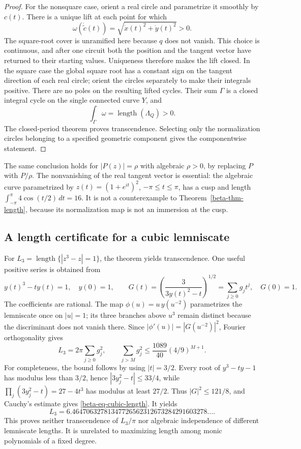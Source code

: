 \documentclass[11pt,a4paper]{article}
\theoremstyle{definition}
\theoremstyle{remark}
\numberwithin{equation}{section}
\begin{document}
\begin{proof}
For the nonsquare case, orient a real circle and parametrize it smoothly
by $c(t)$.  There is a unique lift at each point for which
\[
\omega(\dot{\widetilde c}(t))
=\sqrt{\dot x(t)^2+\dot y(t)^2}>0.
\]
The square-root cover is unramified here because $q$ does not vanish.
This choice is continuous, and after one circuit both the position and
the tangent vector have returned to their starting values.  Uniqueness
therefore makes the lift closed.  In the square case the global square
root has a constant sign on the tangent direction of each real circle;
orient the circles separately to make their integrals positive.
There are no poles on the resulting lifted cycles.  Their sum $\Gamma$
is a closed integral cycle on the single connected curve $Y$, and
\[
\int_\Gamma\omega=\operatorname{length}(\Lambda_Q)>0.
\]
The closed-period theorem proves transcendence.  Selecting only the
normalization circles belonging to a specified geometric component gives
the componentwise statement.
\end{proof}

The same conclusion holds for $|P(z)|=\rho$ with algebraic $\rho>0$, by
replacing $P$ with $P/\rho$.  The nonvanishing of the real tangent vector
is essential: the algebraic curve parametrized by
$z(t)=(1+e^{it})^2$, $-\pi\le t\le\pi$, has a cusp and length
$\int_{-\pi}^{\pi}4\cos(t/2)\,dt=16$.  It is not a counterexample to
Theorem~\ref{beta-thm-length}, because its normalization map is not an
immersion at the cusp.

\subsection{A length certificate for a cubic lemniscate}

For $L_3=\operatorname{length}\{|z^3-z|=1\}$, the theorem yields
transcendence.  One useful positive series is obtained from
\[
y(t)^3-ty(t)=1,\quad y(0)=1,\qquad
G(t)=\left(\frac{3}{3y(t)^2-t}\right)^{1/2}
=\sum_{j\ge0}g_jt^j,\quad G(0)=1.
\]
The coefficients are rational.  The map
$\phi(u)=u\,y(u^{-2})$ parametrizes the lemniscate once on $|u|=1$;
its three branches above $u^3$ remain distinct because the discriminant
does not vanish there.  Since $|\phi'(u)|=|G(u^{-2})|^2$, Fourier
orthogonality gives
\begin{equation}\label{beta-eq-cubic-length}
L_3=2\pi\sum_{j\ge0}g_j^2,\qquad
\sum_{j>M}g_j^2\le\frac{1089}{40}(4/9)^{M+1}.
\end{equation}
For completeness, the bound follows by using $|t|=3/2$.  Every root of
$y^3-ty-1$ has modulus less than $3/2$, hence
$|3y_j^2-t|\le33/4$, while
$\prod_j(3y_j^2-t)=27-4t^3$ has modulus at least $27/2$.
Thus $|G|^2\le121/8$, and Cauchy's estimate gives
\eqref{beta-eq-cubic-length}.  It yields
\[
L_3=6.46470632781347726562312673284291603278\ldots.
\]
This proves neither transcendence of $L_3/\pi$ nor algebraic independence
of different lemniscate lengths.  It is unrelated to maximizing length
among monic polynomials of a fixed degree.
\end{document}
